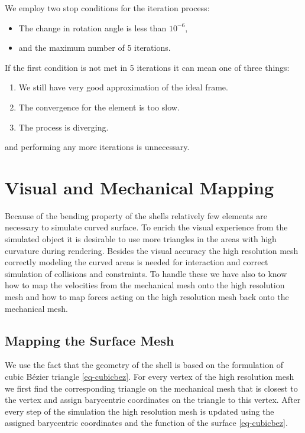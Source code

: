 \documentclass{egpubl}
\begin{document}
We employ two stop conditions for the iteration process:
\begin{itemize}
    \item The change in rotation angle is less than $10^{-6}$,
    \item and the maximum number of 5 iterations.
\end{itemize}

If the first condition is not met in 5 iterations it can mean one of three
things:

\begin{enumerate}
    \item We still have very good approximation of the ideal frame.
    \item The convergence for the element is too slow.
    \item The process is diverging.
\end{enumerate}

\noindent
and performing any more iterations is unnecessary.






\section{Visual and Mechanical Mapping} %

Because of the bending property of the shells relatively few elements are
necessary to simulate curved surface. To enrich the visual experience from
the simulated object it is desirable to use more triangles in the areas
with high curvature during rendering. Besides the visual accuracy the high
resolution mesh correctly modeling the curved areas is needed for
interaction and correct simulation of collisions and constraints. To handle
these we have also to know how to map the velocities from the mechanical
mesh onto the high resolution mesh and how to map forces acting on the high
resolution mesh back onto the mechanical mesh.

\subsection{Mapping the Surface Mesh}

We use the fact that the geometry of the shell is based on the formulation
of cubic B\'ezier triangle \eqref{eq-cubicbez}. For every vertex of the high
resolution mesh we first find the corresponding triangle on the mechanical
mesh that is closest to the vertex and assign barycentric coordinates on
the triangle to this vertex. After every step of the simulation the high
resolution mesh is updated using the assigned barycentric coordinates and
the function of the surface \eqref{eq-cubicbez}.
\end{document}
